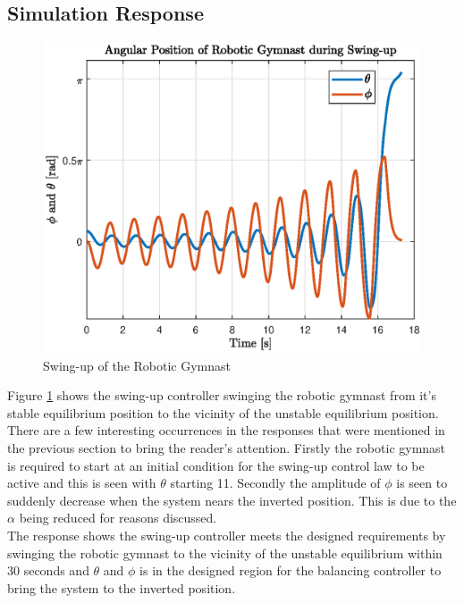 \subsection{Simulation Response}
\begin{figure}[h]
	\centering
	\includegraphics[scale=1]{./figs/swingup}
	\caption{Swing-up of the Robotic Gymnast}
	\label{fig:swingup}
\end{figure}

Figure \ref{fig:swingup} shows the swing-up controller swinging the robotic gymnast from it's stable equilibrium position to the vicinity of the unstable equilibrium position. There are a few interesting occurrences in the responses that were mentioned in the previous section to bring the reader's attention. Firstly the robotic gymnast is required to start at an initial condition for the swing-up control law to be active and this is seen with $\theta$ starting 11\textdegree. Secondly the amplitude of $\phi$ is seen to suddenly decrease when the system nears the inverted position. This is due to the $\alpha$ being reduced for reasons discussed.\\

The response shows the swing-up controller meets the designed requirements by swinging the robotic gymnast to the vicinity of the unstable equilibrium within 30 seconds and $\theta$ and $\phi$ is in the designed region for the balancing controller to bring the system to the inverted position.




